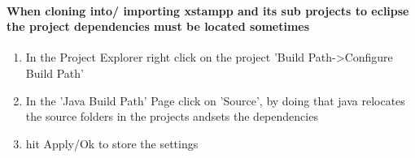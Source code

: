 \paragraph{When cloning into/ importing xstampp and its sub projects to eclipse the project dependencies must be located sometimes}
\begin{enumerate} 
\item In the Project Explorer right click on the project 'Build Path->Configure Build Path'
\item In the 'Java Build Path' Page click on 'Source', by doing that java relocates the source folders in the projects andsets the dependencies
\item hit Apply/Ok to store the settings
\end{enumerate} 